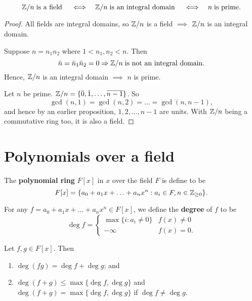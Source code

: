 
\begin{proposition}
    \[ \mathbb{Z}/n \;\text{is a field}\; \quad\Longleftrightarrow\quad \mathbb{Z}/n \;\text{is an integral domain}\; \quad\Longleftrightarrow\quad n \;\text{is prime}. \]
\end{proposition}

\begin{proof}
    All fields are integral domains, so $\mathbb{Z}/n$ is a field $\implies$ $\mathbb{Z}/n$ is an integral domain. 

    Suppose $n = n_1n_2$ where $1 < n_1, n_2 < n$. Then
    \[ \bar n = \bar n_1 \bar n_2 = 0 \Rightarrow \mathbb{Z}/n \;\text{is not an integral domain}. \]
    Hence, $\mathbb{Z}/n$ is an integral domain $\implies$ $n$ is prime.

    Let $n$ be prime. $\mathbb{Z}/n = \{ \bar 0, \bar 1, \ldots, \overline{n-1} \}$. So
    \[ \gcd(n, 1) = \gcd(n,2) = \ldots = \gcd(n, n - 1), \]
    and hence by an earlier proposition, $1, 2, \ldots, n - 1$ are units. With $\mathbb{Z}/n$ being a commutative ring too, it is also a field. 
\end{proof}

\chapter{Polynomials over a field}

\begin{definition}
    The \textbf{polynomial ring} $F[x]$ in $x$ over the field $F$ is define to be
    \[ F[x] = \{ a_0 + a_1 x + \ldots + a_n x^n : a_i \in F, n \in \mathbb{Z}_{\geq 0} \}. \]
\end{definition}

\begin{definition}
    For any $f = a_0 + a_1 x + \ldots + a_n x^n \in F[x]$, we define the \textbf{degree} of $f$ to be 
    \[
        \deg f =
        \begin{cases}
            \max\{i : a_i \neq 0\} & f(x) \neq 0 \\
            -\infty & f(x) = 0.
        \end{cases}
    \]
\end{definition}

\begin{proposition}
    Let $f, g \in F[x]$. Then
    \begin{enumerate}
        \item $\deg(fg) = \deg{f} + \deg{g}$; and
        \item $\deg(f + g) \leq \max\{ \deg f, \deg g\}$ and $\deg(f + g) = \max\{ \deg f, \deg g \}$ if $\deg f \neq \deg g$.
    \end{enumerate}
\end{proposition}

